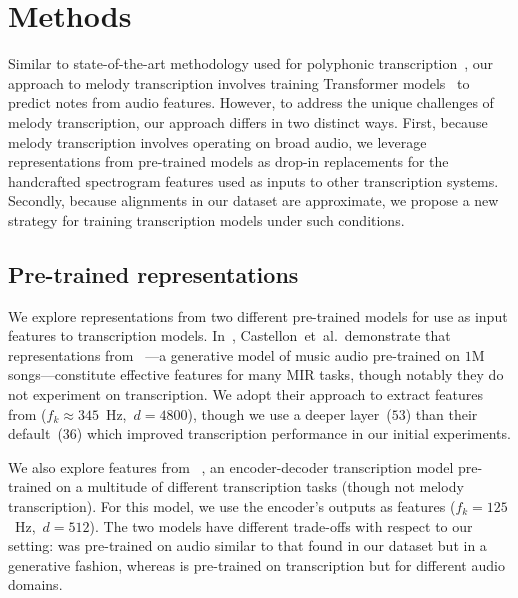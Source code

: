 \vspace{-3mm}
\section{Methods}

Similar to state-of-the-art methodology used for polyphonic transcription~\cite{hawthorne2021sequence}, 
our approach to melody transcription involves training Transformer models~\cite{vaswani2017attention} to predict notes from audio features. 
However, to address the unique challenges 
of melody transcription, our approach differs in two distinct ways. 
First, because melody transcription involves operating on broad audio, we leverage representations from pre-trained models as drop-in replacements for the handcrafted spectrogram features used as inputs to other transcription systems. 
Secondly, because alignments in our dataset are approximate, we propose a new strategy for training transcription models under such conditions.

\subsection{Pre-trained representations}
\label{sec:representations}

We explore representations from two different pre-trained models for use as input features to transcription models.
In~\cite{castellon2021calm}, Castellon~et~al.\ demonstrate that representations from \jukebox~\cite{dhariwal2020jukebox}---a generative model of music audio pre-trained on $1$M songs---constitute effective features for many MIR tasks, though notably they do not experiment on transcription. 
We adopt their approach to extract features from \jukebox{} (${f_k \approx 345}$~Hz,~${d = 4800}$), though we use a deeper layer~($53$) than their default~($36$) which improved transcription performance in our initial experiments. 

We also explore features from \mtthree~\cite{gardner2021mt3}, an encoder-decoder transcription model pre-trained on a multitude of different transcription tasks (though not melody transcription). 
For this model, we use the encoder's outputs as features (${f_k = 125}$~Hz,~${d = 512}$). 
The two models have different trade-offs with respect to our setting: \jukebox{} was pre-trained on audio similar to that found in our dataset but in a generative fashion, 
whereas \mtthree{} is pre-trained on transcription but for different audio domains.

